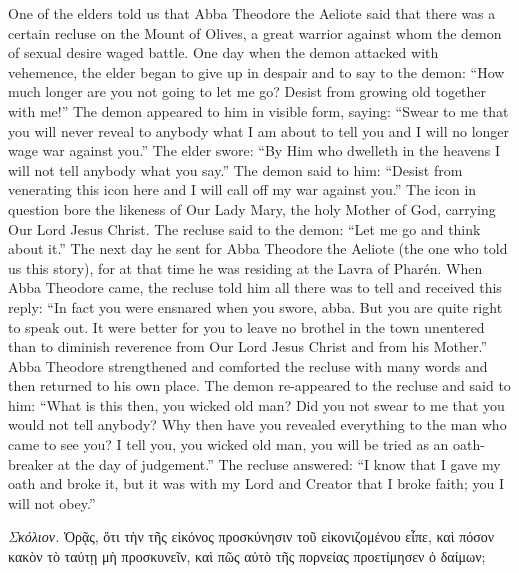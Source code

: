 \documentclass[10pt]{book}
\newcommand{\switchgreek}[1][]{\selectlanguage{polutonikogreek} \switchcolumn*[#1]}
\newcommand{\switchenglish}{\selectlanguage{english} \switchcolumn}
\begin{document}
\begin{paracol}{2}
One of the elders told us that Abba Theodore the Aeliote said that
there was a certain recluse on the Mount of Olives,
a great warrior against whom the demon of sexual desire waged battle.
One day when the demon attacked with vehemence,
the elder began to give up in despair and to say to the demon:
``How much longer are you not going to let me go?
Desist from growing old together with me!''
The demon appeared to him in visible form, saying:
``Swear to me that you will never reveal to anybody what
I am about to tell you and I will no longer wage war against you.''
The elder swore:
``By Him who dwelleth in the heavens I will not tell anybody what you say.''
The demon said to him:
``Desist from venerating this icon here
and I will call off my war against you.''
The icon in question bore the likeness of Our Lady Mary,
the holy Mother of God, carrying Our Lord Jesus Christ.
The recluse said to the demon: ``Let me go and think about it.''
The next day he sent for Abba Theodore the Aeliote
(the one who told us this story), for at that time he
was residing at the Lavra of Pharén. When Abba Theodore came, the recluse told
him all there was to tell and received this reply: ``In fact you were ensnared
when you swore, abba. But you are quite right to speak out. It were better for
you to leave no brothel in the town unentered than to diminish reverence from
Our Lord Jesus Christ and from his Mother.'' Abba Theodore strengthened and
comforted the recluse with many words and then returned to his own place. The
demon re-appeared to the recluse and said to him: ``What is this then, you
wicked old man? Did you not swear to me that you would not tell anybody? Why
then have you revealed everything to the man who came to see you? I tell you,
you wicked old man, you will be tried as an oath-breaker at the day of
judgement.'' The recluse answered: ``I know that I gave my oath and broke it,
but it was with my Lord and Creator that I broke faith; you I will not obey.''

\switchgreek

\emph{Σκόλιον.} Ὁρᾷς, ὅτι τὴν τῆς εἰκόνος προσκύνησιν τοῦ εἰκονιζομένου εἶπε, καὶ πόσον κακὸν τὸ ταύτῃ μὴ προσκυνεῖν, καὶ πῶς αὐτὸ τῆς πορνείας προετίμησεν ὁ δαίμων;

\switchenglish


\end{paracol}
\end{document}
